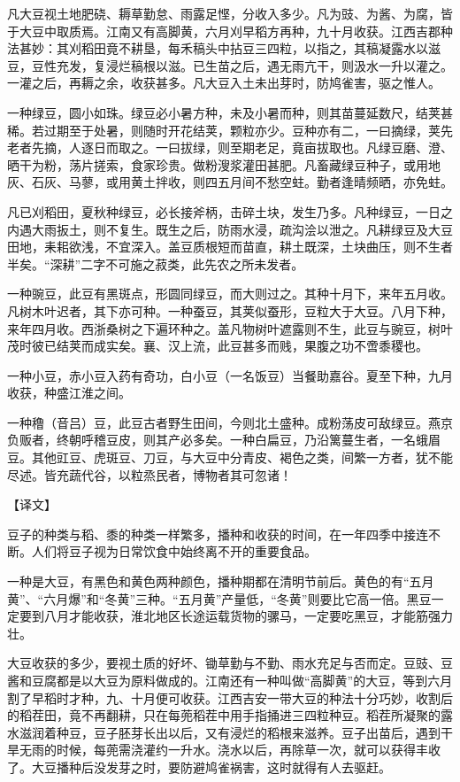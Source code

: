 \documentclass[12pt,UTF8]{ctexbook}
\begin{document}
凡大豆视土地肥硗、耨草勤怠、雨露足悭，分收入多少。凡为豉、为酱、为腐，皆于大豆中取质焉。江南又有高脚黄，六月刈早稻方再种，九十月收获。江西吉郡种法甚妙：其刈稻田竟不耕垦，每禾稿头中拈豆三四粒，以指之，其稿凝露水以滋豆，豆性充发，复浸烂稿根以滋。已生苗之后，遇无雨亢干，则汲水一升以灌之。一灌之后，再耨之余，收获甚多。凡大豆入土未出芽时，防鸠雀害，驱之惟人。

一种绿豆，圆小如珠。绿豆必小暑方种，未及小暑而种，则其苗蔓延数尺，结荚甚稀。若过期至于处暑，则随时开花结荚，颗粒亦少。豆种亦有二，一曰摘绿，荚先老者先摘，人逐日而取之。一曰拔绿，则至期老足，竟亩拔取也。凡绿豆磨、澄、晒干为粉，荡片搓索，食家珍贵。做粉溲浆灌田甚肥。凡畜藏绿豆种子，或用地灰、石灰、马蓼，或用黄土拌收，则四五月间不愁空蛀。勤者逢晴频晒，亦免蛀。

凡已刈稻田，夏秋种绿豆，必长接斧柄，击碎土块，发生乃多。凡种绿豆，一日之内遇大雨扳土，则不复生。既生之后，防雨水浸，疏沟浍以泄之。凡耕绿豆及大豆田地，耒耜欲浅，不宜深入。盖豆质根短而苗直，耕土既深，土块曲压，则不生者半矣。“深耕”二字不可施之菽类，此先农之所未发者。

一种豌豆，此豆有黑斑点，形圆同绿豆，而大则过之。其种十月下，来年五月收。凡树木叶迟者，其下亦可种。一种蚕豆，其荚似蚕形，豆粒大于大豆。八月下种，来年四月收。西浙桑树之下遍环种之。盖凡物树叶遮露则不生，此豆与豌豆，树叶茂时彼已结荚而成实矣。襄、汉上流，此豆甚多而贱，果腹之功不啻黍稷也。

一种小豆，赤小豆入药有奇功，白小豆（一名饭豆）当餐助嘉谷。夏至下种，九月收获，种盛江淮之间。

一种穞（音吕）豆，此豆古者野生田间，今则北土盛种。成粉荡皮可敌绿豆。燕京负贩者，终朝呼稽豆皮，则其产必多矣。一种白扁豆，乃沿篱蔓生者，一名蛾眉豆。其他豇豆、虎斑豆、刀豆，与大豆中分青皮、褐色之类，间繁一方者，犹不能尽述。皆充蔬代谷，以粒烝民者，博物者其可忽诸！

【译文】

豆子的种类与稻、黍的种类一样繁多，播种和收获的时间，在一年四季中接连不断。人们将豆子视为日常饮食中始终离不开的重要食品。

一种是大豆，有黑色和黄色两种颜色，播种期都在清明节前后。黄色的有“五月黄”、“六月爆”和“冬黄”三种。“五月黄”产量低，“冬黄”则要比它高一倍。黑豆一定要到八月才能收获，淮北地区长途运载货物的骡马，一定要吃黑豆，才能筋强力壮。

大豆收获的多少，要视土质的好坏、锄草勤与不勤、雨水充足与否而定。豆豉、豆酱和豆腐都是以大豆为原料做成的。江南还有一种叫做“高脚黄”的大豆，等到六月割了早稻时才种，九、十月便可收获。江西吉安一带大豆的种法十分巧妙，收割后的稻茬田，竟不再翻耕，只在每蔸稻茬中用手指捅进三四粒种豆。稻茬所凝聚的露水滋润着种豆，豆子胚芽长出以后，又有浸烂的稻根来滋养。豆子出苗后，遇到干旱无雨的时候，每蔸需浇灌约一升水。浇水以后，再除草一次，就可以获得丰收了。大豆播种后没发芽之时，要防避鸠雀祸害，这时就得有人去驱赶。
\end{document}
